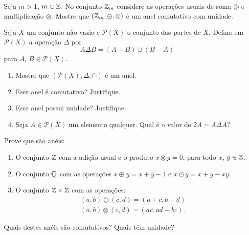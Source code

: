 \documentclass[12pt]{exam}
\begin{document}
    \vspace{.3cm}

    \questao{} Seja $m > 1$, $m \in \mathbb{Z}$. No conjunto $\mathbb{Z}_m$ considere as opera\c{c}\~oes usuais de soma $\oplus$ e multiplica\c{c}\~ao $\otimes$. Mostre que $(\mathbb{Z}_m, \oplus, \otimes)$ \'e um anel comutativo com unidade.

    \vspace{.3cm}

    \questao{} Seja $X$ um conjunto não vazio e $\mathcal{P}(X)$ o conjunto das partes de $X$. Defina em $\mathcal{P}(X)$ a operação $\Delta$ por
    \[
        A \Delta B = (A - B) \cup (B - A)
    \]
    para $A$, $B \in \mathcal{P}(X)$.
    \begin{enumerate}[label={\alph*})]
        \item Mostre que $(\mathcal{P}(X), \Delta, \cap)$ é um anel.

        \item Esse anel é comutativo? Justifique.

        \item Esse anel possui unidade? Justifique.

        \item Seja $A \in \mathcal{P}(X)$ um elemento qualquer. Qual é o valor de $2A = A \Delta A$?
    \end{enumerate}

    \vspace{.3cm}

    \questao{} Prove que s\~ao an\'eis:
    \begin{enumerate}[label={\alph*})]
        \item O conjunto $\mathbb{Z}$ com a adi\c{c}\~ao usual e o produto $x \otimes y = 0$, para todo $x$, $y \in \mathbb{Z}$.
        \item O conjunto $\mathbb{Q}$ com as opera\c{c}\~oes $x \oplus y = x + y - 1$ e $x \odot y = x + y - xy$.
        \item O conjunto $\mathbb{Z} \times \mathbb{Z}$ com as opera\c{c}\~oes:
        \begin{align*}
            (a, b) \oplus (c, d) = (a + c, b + d)\\
            (a ,b) \otimes (c, d) = (ac, ad + bc).
        \end{align*}
    \end{enumerate}
    Quais destes an\'eis s\~ao comutativos? Quais t\^em unidade?

    \vspace{.3cm}
\end{document}
